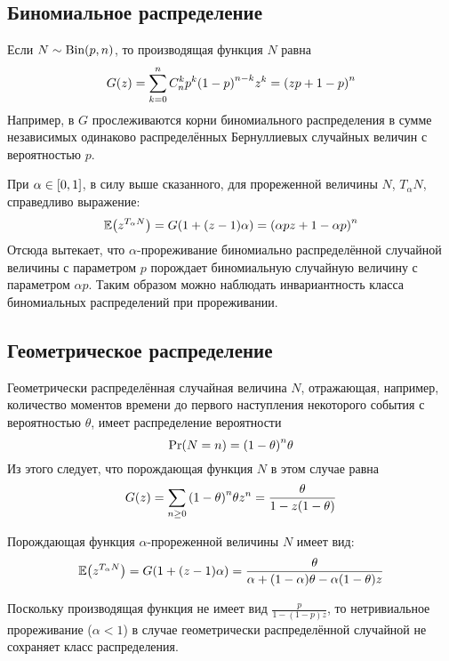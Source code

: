 \documentclass[a4paper]{article}
\let\originalleft\left
\let\originalright\right
\renewcommand{\left}{\mathopen{}\mathclose\bgroup\originalleft}
\renewcommand{\right}{\aftergroup\egroup\originalright}
\newcommand{\clo}[1]{{\left [ #1 \right ]}}
\newcommand{\brac}[1]{{\left ( #1 \right )}}
\newcommand{\Ex}[0]{{\mathbb{E}}}
\begin{document}

\subsection{Биномиальное распределение} %
\label{sub:binomial}

Если $N\sim\text{Bin}\brac{p,n}$, то производящая функция $N$ равна
\[G(z) = \sum_{k=0}^n C_n^k p^k \brac{1-p}^{n-k} z^k
	= \brac{ zp + 1-p }^n\]
Например, в $G$ прослеживаются корни биномиального распределения в сумме
независимых одинаково распределённых Бернуллиевых случайных величин с
вероятностью $p$.

При $\alpha\in \clo{0,1}$, в силу выше сказанного, для прореженной величины
$N$, $T_\alpha N$, справедливо выражение:
\[\Ex\brac{z^{T_\alpha N}} = G\brac{1 + (z-1) \alpha}
	= \brac{ \alpha p z + 1 - \alpha p }^n\]
Отсюда вытекает, что $\alpha$-прореживание биномиально распределённой
случайной величины с параметром $p$ порождает биномиальную случайную величину
с параметром $\alpha p$.
Таким образом можно наблюдать инвариантность класса биномиальных распределений
при прореживании.


\subsection{Геометрическое распределение} %
\label{sub:geometric}

Геометрически распределённая случайная величина $N$, отражающая, например,
количество моментов времени до первого наступления некоторого события с
вероятностью $\theta$, имеет распределение вероятности
\[\Pr(N=n) = \brac{1-\theta}^n \theta \]
Из этого следует, что порождающая функция $N$ в этом случае равна
\[G(z) = \sum_{n\geq 0} \brac{1-\theta}^n \theta z^n = \frac{\theta}{1 - z (1-\theta)}\]

Порождающая функция $\alpha$-прореженной величины $N$ имеет вид:
\[ \Ex\brac{z^{T_\alpha N}} = G\brac{1 + (z-1) \alpha}
= \frac{\theta}{\alpha + (1-\alpha) \theta - \alpha (1-\theta) z }\]

Поскольку производящая функция не имеет вид $\frac{p}{1-(1-p)z}$, то
нетривиальное прореживание ($\alpha < 1$) в случае геометрически
распределённой случайной не сохраняет класс распределения.

\end{document}
